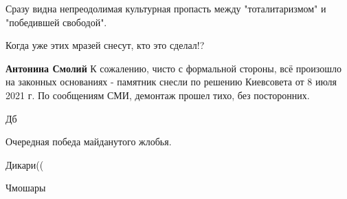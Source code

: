 \begin{itemize}
Сразу видна непреодолимая культурная пропасть между "тоталитаризмом" и "победившей свободой".

 
Когда уже этих мразей снесут, кто это сделал!?

\begin{itemize}
 
\textbf{Антонина Смолий} К сожалению, чисто с формальной стороны, всё произошло на законных основаниях - памятник снесли по решению Киевсовета от 8 июля 2021 г. По сообщениям СМИ, демонтаж прошел тихо, без посторонних.
\end{itemize}

 
Дб

 
Очередная победа майданутого жлобья.

 
Дикари((

 
Чмошары


\end{itemize}
